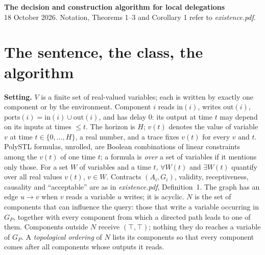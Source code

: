 \documentclass[10pt]{article}
\theoremstyle{plain}\newtheorem{theorem}{Theorem}\newtheorem{lemma}{Lemma}\newtheorem{proposition}{Proposition}
\theoremstyle{definition}\newtheorem{definition}{Definition}\newtheorem{remark}{Remark}
\newcommand{\ports}{\mathrm{ports}}\newcommand{\inp}{\mathrm{in}}\newcommand{\outp}{\mathrm{out}}\newcommand{\priv}{\mathrm{priv}}\newcommand{\edge}{\mathrm{edge}}
\begin{document}
\begin{center}\textbf{The decision and construction algorithm for local delegations}\\ 18 October 2026. Notation, Theorems 1--3 and Corollary 1 refer to \emph{existence.pdf}.\end{center}

\section{The sentence, the class, the algorithm}
\textbf{Setting.} $V$ is a finite set of real-valued variables; each is written by exactly one component or by the environment. Component $i$ reads $\inp(i)$, writes $\outp(i)$, $\ports(i)=\inp(i)\cup\outp(i)$, and has delay $0$: its output at time $t$ may depend on its inputs at times $\le t$. The horizon is $H$; $v(t)$ denotes the value of variable $v$ at time $t\in\{0,\dots,H\}$, a real number, and a trace fixes $v(t)$ for every $v$ and $t$. PolySTL formulas, unrolled, are Boolean combinations of linear constraints among the $v(t)$ of one time $t$; a formula is \emph{over} a set of variables if it mentions only those. For a set $W$ of variables and a time $t$, $\forall W(t)$ and $\exists W(t)$ quantify over all real values $v(t)$, $v\in W$. Contracts $(A_i,G_i)$, validity, receptiveness, causality and ``acceptable'' are as in \emph{existence.pdf}, Definition~1. The graph has an edge $u\to v$ when $v$ reads a variable $u$ writes; it is acyclic. $N$ is the set of components that can influence the query: those that write a variable occurring in $G_P$, together with every component from which a directed path leads to one of them. Components outside $N$ receive $(\top,\top)$; nothing they do reaches a variable of $G_P$. A \emph{topological ordering} of $N$ lists its components so that every component comes after all components whose outputs it reads.
\end{document}
